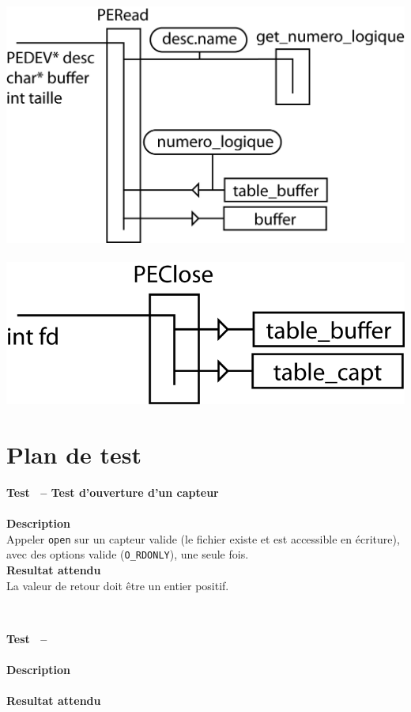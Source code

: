 \documentclass[11pt, a4paper]{article}
\newcommand{\kw}[1]{\texttt{#1}}
\newcommand{\Test}[3]
{%
	\addtocounter{testno}{1}
	\begin{minipage}{\textwidth}
	\textbf{\large{Test \thetestno~-- #1}}\\
	\raisebox{0.5em}{\rule{\textwidth}{0.1ex}}\\
	\textbf{\large{Description}}\\
	#2 \\
	\textbf{\large{Resultat attendu}}\\
	#3 
	\end{minipage}
}
\begin{document}
\includegraphics{ressources/read.png}\\~\\
\includegraphics{ressources/close.png}

\section{Plan de test}
\Test{Test d'ouverture d'un capteur}
{Appeler \kw{open} sur un capteur valide (le fichier existe et est accessible en écriture), avec des options valide (\kw{O\_RDONLY}), une seule fois.} 
{La valeur de retour doit être un entier positif.}~

\Test{ }{}{}
\end{document}
